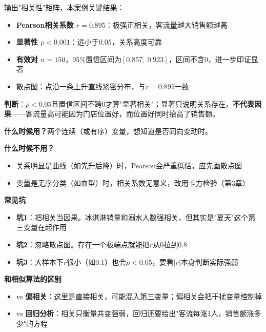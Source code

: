 \begin{algoresult}
输出"相关性"矩阵，本案例关键结果：
\begin{itemize}
    \item \textbf{Pearson相关系数 $r=0.895$}：极强正相关，客流量越大销售额越高
    \item \textbf{显著性 $p<0.001$}：远小于0.05，关系高度可靠
    \item \textbf{有效对 $n=150$}，95\%置信区间为$[0.857,\ 0.923]$，区间不含0，进一步印证显著
    \item 散点图：点沿一条上升直线紧密分布，与$r=0.895$一致
\end{itemize}

\textbf{判断}：$p<0.05$且置信区间不跨0才算"显著相关"；显著只说明关系存在，\textbf{不代表因果}——客流量高可能因为门店位置好，而位置好同时抬高了销售额。
\end{algoresult}

\begin{algonotes}
\textbf{什么时候用？}两个连续（或有序）变量，想知道是否同向变动时。

\textbf{什么时候不用？}
\begin{itemize}
    \item 关系明显是曲线（如先升后降）时，Pearson会严重低估，应先画散点图
    \item 变量是无序分类（如血型）时，相关系数无意义，改用卡方检验（第3章）
\end{itemize}

\textbf{常见坑}
\begin{itemize}
    \item \textbf{坑1}：把相关当因果。冰淇淋销量和溺水人数强相关，但其实是"夏天"这个第三变量在起作用
    \item \textbf{坑2}：忽略散点图。存在一个极端点就能把$r$从0拉到0.8
    \item \textbf{坑3}：大样本下$r$很小（如0.1）也会$p<0.05$，要看$|r|$本身判断实际强弱
\end{itemize}

\textbf{和相似算法的区别}
\begin{itemize}
    \item vs \textbf{偏相关}：这里是直接相关，可能混入第三变量；偏相关会把干扰变量控制掉
    \item vs \textbf{回归分析}：相关只衡量共变强弱，回归还要给出"客流每涨1人，销售额涨多少"的方程
\end{itemize}
\end{algonotes}


